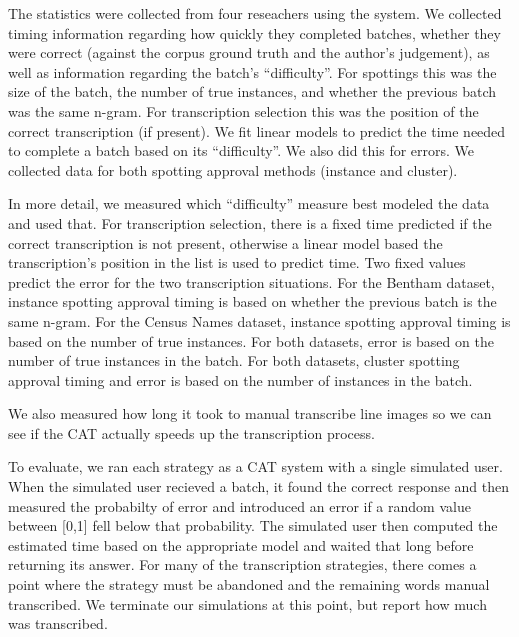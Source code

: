 \documentclass[ms,electronic,twosidetoc,letterpaper,chaptercenter,parttop,lof,lot]{byumsphd}
\begin{document}
The statistics were collected from four reseachers
using the system. We collected timing information regarding how quickly they completed batches, whether they were correct (against the corpus ground truth and the author's judgement), as well as information regarding the batch's ``difficulty''. For spottings this was the size of the batch, the number of true instances, and whether the previous batch was the same n-gram. For transcription selection this was the position of the correct transcription (if present). 
We fit linear models to predict the time needed to complete a batch based on its ``difficulty''. We also did this for errors.
We collected data for both spotting approval methods (instance and cluster).

In more detail, we measured which ``difficulty'' measure best modeled the data and used that. For transcription selection, there is a fixed time predicted if the correct transcription is not present, otherwise a linear model based the transcription's position in the list is used to predict time. Two fixed values predict the error for the two transcription situations. 
For the Bentham dataset, instance spotting approval timing is based on whether the previous batch is the same n-gram. For the Census Names dataset, instance spotting approval timing is based on the number of true instances. For both datasets, error is based on the number of true instances in the batch. For both datasets, cluster spotting approval timing and error is based on the number of instances in the batch.

We also measured how long it took to manual transcribe line images so we can see if the CAT actually speeds up the transcription process.

To evaluate, we ran each strategy as a CAT system with a single simulated user. When the simulated user recieved a batch, it found the correct response and then measured the probabilty of error and introduced an error if a random value between [0,1] fell below that probability. The simulated user then computed the estimated time based on the appropriate model and waited that long before returning its answer. For many of the transcription strategies, there comes a point where the strategy must be abandoned and the remaining words manual transcribed. We terminate our simulations at this point, but report how much was transcribed.
\end{document}
